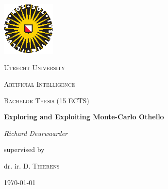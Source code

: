 \documentclass[
11pt, %
english, %
singlespacing, %
headsepline, %
]{MastersDoctoralThesis} %
\author{Richard \textsc{Deurwaarder}} %
\begin{document}
\frontmatter

\begin{titlepage}
	\centering
	\includegraphics[width=0.20\textwidth]{images/uu-logo}\par\vspace{1cm}
	{\scshape\LARGE Utrecht University \par}
	\vspace{0.5cm}
	{\scshape\Large Artificial Intelligence\par}
	{\scshape\Large Bachelor Thesis (15 ECTS)\par}
	\vspace{1.5cm}
	{\huge\bfseries Exploring and Exploiting Monte-Carlo Othello\par}
	\vspace{0.5cm}
	{\Large\itshape Richard Deurwaarder\par}
	\vfill
	supervised by\par
	dr. ir. D. \textsc{Thierens}
	
	\vfill
	
	{\large \today\par}
\end{titlepage}


\begin{abstract}
	\addchaptertocentry{\abstractname} %
	The Exploration versus Exploitation dilemma is a trade-off which presents itself in many algorithms including Monte Carlo Tree Search with the UCT policy. UCT is designed to control this trade-off and is influenced via a specific parameter: the exploration parameter. A faulty assumption is sometimes made that this exploration parameter is robust and has a sane default value. In this paper, I will use the board game Othello to show the influence of the exploration parameter and show that using this `default' value rather than a value tuned for a specific problem can have dramatic performance implications.
\end{abstract}
\end{document}
